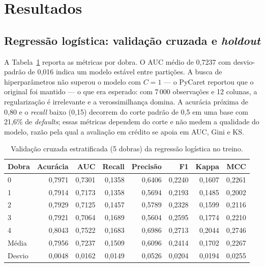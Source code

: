 \documentclass[11pt,a4paper]{article}
\begin{document}
\section{Resultados}
\label{sec:resultados}

\subsection{Regressão logística: validação cruzada e \emph{holdout}}
\label{sec:resultados-lr}

A Tabela~\ref{tab:cv} reporta as métricas por dobra. O AUC médio de 0{,}7237 com desvio-padrão de 0{,}016 indica um modelo estável entre partições. A busca de hiperparâmetros não superou o modelo com $C=1$ --- o PyCaret reportou que o original foi mantido --- o que era esperado: com 7\,000 observações e 12 colunas, a regularização é irrelevante e a verossimilhança domina. A acurácia próxima de 0{,}80 e o \emph{recall} baixo (0{,}15) decorrem do corte padrão de 0{,}5 em uma base com 21{,}6\% de \emph{defaults}; essas métricas dependem do corte e não medem a qualidade do modelo, razão pela qual a avaliação em crédito se apoia em AUC, Gini e KS.

\begin{table}[H]
\centering\small
\caption{Validação cruzada estratificada (5 dobras) da regressão logística no treino.}
\label{tab:cv}
\begin{tabular}{lrrrrrrr}
\toprule
Dobra & Acurácia & AUC & Recall & Precisão & F1 & Kappa & MCC \\
\midrule
0 & 0,7971 & 0,7301 & 0,1358 & 0,6406 & 0,2240 & 0,1607 & 0,2261 \\
1 & 0,7914 & 0,7173 & 0,1358 & 0,5694 & 0,2193 & 0,1485 & 0,2002 \\
2 & 0,7929 & 0,7125 & 0,1457 & 0,5789 & 0,2328 & 0,1599 & 0,2116 \\
3 & 0,7921 & 0,7064 & 0,1689 & 0,5604 & 0,2595 & 0,1774 & 0,2210 \\
4 & 0,8043 & 0,7522 & 0,1683 & 0,6986 & 0,2713 & 0,2044 & 0,2746 \\
\midrule
Média & 0,7956 & 0,7237 & 0,1509 & 0,6096 & 0,2414 & 0,1702 & 0,2267 \\
Desvio & 0,0048 & 0,0162 & 0,0149 & 0,0526 & 0,0204 & 0,0194 & 0,0255 \\
\bottomrule
\end{tabular}
\end{table}
\end{document}

